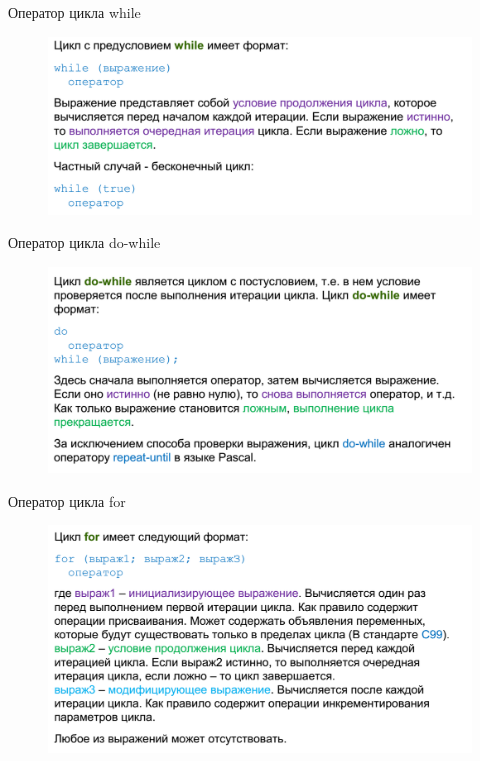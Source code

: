 \documentclass{beamer}
\begin{document}
\begin{frame}{Оператор цикла while}
\begin{figure}[h]
\centering
\includegraphics[scale=0.4]{images/lec02-pic16.png}
\end{figure}
\end{frame}

\begin{frame}{Оператор цикла do-while}
\begin{figure}[h]
\centering
\includegraphics[scale=0.4]{images/lec02-pic17.png}
\end{figure}
\end{frame}

\begin{frame}{Оператор цикла for}
\begin{figure}[h]
\centering
\includegraphics[scale=0.4]{images/lec02-pic18.png}
\end{figure}
\end{frame}
\end{document}
